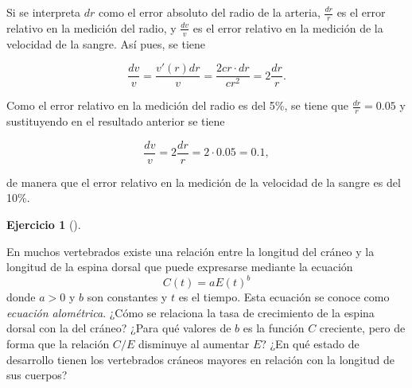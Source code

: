 \documentclass[
  spanish,
  a4paper,
]{scrreport}
\theoremstyle{definition}
\newtheorem{exercise}{Ejercicio}[chapter]
\theoremstyle{remark}
\begin{document}
\begin{tcolorbox}[enhanced jigsaw, arc=.35mm, bottomrule=.15mm, bottomtitle=1mm, breakable, colback=white, colbacktitle=quarto-callout-tip-color!10!white, colframe=quarto-callout-tip-color-frame, coltitle=black, left=2mm, leftrule=.75mm, opacityback=0, opacitybacktitle=0.6, rightrule=.15mm, title=\textcolor{quarto-callout-tip-color}{\faLightbulb}\hspace{0.5em}{Solución}, titlerule=0mm, toprule=.15mm, toptitle=1mm]

Si se interpreta \(dr\) como el error absoluto del radio de la arteria,
\(\frac{dr}{r}\) es el error relativo en la medición del radio, y
\(\frac{dv}{v}\) es el error relativo en la medición de la velocidad de
la sangre. Así pues, se tiene

\[
\frac{dv}{v} = \frac{v'(r)dr}{v} = \frac{2cr\cdot dr}{cr^2} = 2\frac{dr}{r}.
\]

Como el error relativo en la medición del radio es del 5\%, se tiene que
\(\frac{dr}{r}=0.05\) y sustituyendo en el resultado anterior se tiene

\[
\frac{dv}{v} = 2\frac{dr}{r} = 2\cdot 0.05 = 0.1,
\]

de manera que el error relativo en la medición de la velocidad de la
sangre es del 10\%.

\end{tcolorbox}

\begin{exercise}[]\protect\hypertarget{exr-crecimiento-1}{}\label{exr-crecimiento-1}

En muchos vertebrados existe una relación entre la longitud del cráneo y
la longitud de la espina dorsal que puede expresarse mediante la
ecuación \[
C(t) = a E(t)^b
\] donde \(a>0\) y \(b\) son constantes y \(t\) es el tiempo. Esta
ecuación se conoce como \emph{ecuación alométrica}. ¿Cómo se relaciona
la tasa de crecimiento de la espina dorsal con la del cráneo? ¿Para qué
valores de \(b\) es la función \(C\) creciente, pero de forma que la
relación \(C/E\) disminuye al aumentar \(E\)? ¿En qué estado de
desarrollo tienen los vertebrados cráneos mayores en relación con la
longitud de sus cuerpos?

\end{exercise}
\end{document}
